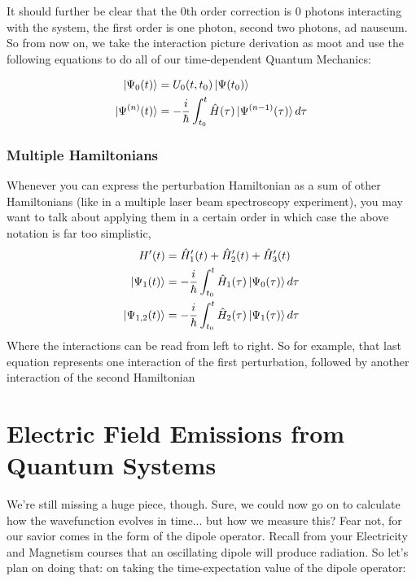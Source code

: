 It should further be clear that the 0th order correction is 0 photons interacting with the system, the first order is one photon, second two photons, ad nauseum.  So from now on, we take the interaction picture derivation as moot and use the following equations to do all of our time-dependent Quantum Mechanics:

\begin{align}
   \ket{\Psi_0 (t)} &= U_{0} (t, t_0) \ket{\Psi(t_0)} \\
   \ket{\Psi^{(n)} (t)} &= -\frac{i}{\hbar} \int_{t_0}^{t} \hat{H} (\tau) \ket{\Psi^{(n-1)} (\tau)} d\tau
\end{align}



\subsubsection{Multiple Hamiltonians}
Whenever you can express the perturbation Hamiltonian as a sum of other Hamiltonians (like in a multiple laser beam spectroscopy experiment), you may want to talk about applying them in a certain order in which case the above notation is far too simplistic,
\begin{align}
	H'(t) &= \hat{H}'_1(t) + \hat{H}'_2(t) + \hat{H}'_3(t) \\
	\ket{\Psi_{1}(t)} &= -\frac{i}{\hbar} \int_{t_0}^{t} \hat{H}_1 (\tau) \ket{\Psi_0 (\tau)} d\tau\\
	\ket{\Psi_{1,2}(t)} &= -\frac{i}{\hbar} \int_{t_0}^{t} \hat{H}_2 (\tau) \ket{\Psi_{1} (\tau)} d\tau
\end{align}
Where the interactions can be read from left to right.  So for example, that last equation represents one interaction of the first perturbation, followed by another interaction of the second Hamiltonian



\section{Electric Field Emissions from Quantum Systems}
We're still missing a huge piece, though.  Sure, we could now go on to calculate how the wavefunction evolves in time... but how   we measure this?  Fear not, for our savior comes in the form of the dipole operator.  Recall from your Electricity and Magnetism courses that an oscillating dipole will produce radiation.  So let's plan on doing that: on taking the time-expectation value of the dipole operator:

